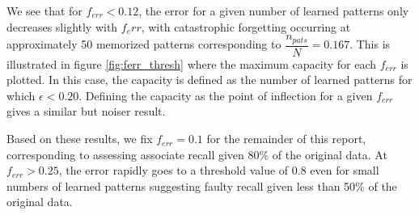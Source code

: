 \documentclass{article}
\begin{document}
We see that for $f_{err} < 0.12$,  the error for a given number of learned patterns only decreases slightly with $f_err$, with catastrophic forgetting occurring at approximately 50 memorized patterns corresponding to $\dfrac{n_{pats}}{N} = 0.167$. This is illustrated in figure \ref{fig:ferr_thresh} where the maximum capacity for each $f_{err}$ is plotted. In this case, the capacity is defined as the number of learned patterns for which $\epsilon < 0.20$. Defining the capacity as the point of inflection for a given $f_{err}$ gives a similar but noiser result.

Based on these results, we fix $f_{err} = 0.1$ for the remainder of this report, corresponding to assessing associate recall given $80\%$ of the original data. At $f_{err} > 0.25$, the error rapidly goes to a threshold value of $0.8$ even for small numbers of learned patterns suggesting faulty recall given less than 50\% of the original data.
\end{document}
